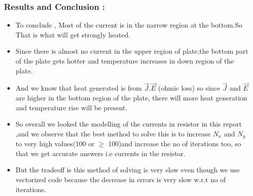 \documentclass[11pt]{article}
\providecommand{\tightlist}{%
      \setlength{\itemsep}{0pt}\setlength{\parskip}{0pt}}
\begin{document}
	

	
		
    \subsubsection{Results and Conclusion :}\label{results-and-conclusion}

\begin{itemize}
\tightlist
\item
  To conclude , Most of the current is in the narrow region at the
  bottom.So That is what will get strongly heated.
\item
  Since there is almost no current in the upper region of plate,the
  bottom part of the plate gets hotter and temperature increases in down
  region of the plate.
\item
  And we know that heat generated is from \(\vec{J}.\vec{E}\) (ohmic
  loss) so since \(\vec{J}\) and \(\vec{E}\) are higher in the bottom
  region of the plate, there will more heat generation and temperature
  rise will be present.
\item
  So overall we looked the modelling of the currents in resistor in this
  report ,and we observe that the best method to solve this is to
  increase \(N_x\) and \(N_y\) to very high values(100 or \(\geq\)
  100)and increase the no of iterations too, so that we get accurate
  answers i.e currents in the resistor.
\item
  But the tradeoff is this method of solving is very slow even though we
  use vectorized code because the decrease in errors is very slow w.r.t
  no of iterations.
\end{itemize}

	


    
    
    
    
\end{document}
